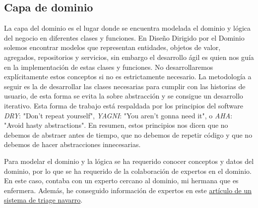 \subsection{Capa de dominio}
La capa del dominio es el lugar donde se encuentra modelada el dominio y lógica del negocio en diferentes clases y funciones.
En Diseño Dirigido por el Dominio solemos encontrar modelos que representan entidades, objetos de valor, agregados, repositorios y servicios, sin embargo
el desarrollo ágil es quien nos guía en la implementación de estas clases y funciones. No desarrollaremos explícitamente estos conceptos si no es estrictamente necesario.
La metodología a seguir es la de desarrollar las clases necesarias para cumplir con las historias de usuario, de esta forma se evita la sobre abstracción y se consigue un desarrollo iterativo.
Esta forma de trabajo está respaldada por los principios del software \textit{DRY}: "Don't repeat yourself", \textit{YAGNI}: "You aren't gonna need it", o \textit{AHA}: "Avoid hasty abstractions".
En resumen, estos principios nos dicen que no debemos de abstraer antes de tiempo, que no debemos de repetir código y que no debemos de hacer abstracciones innecesarias.

Para modelar el dominio y la lógica se ha requerido conocer conceptos y datos del dominio, por lo que se ha requerido de la colaboración de expertos en el dominio.
En este caso, contaba con un experto cercano al dominio, mi hermana que es enfermera. Además, he conseguido información de expertos en este \href{https://scielo.isciii.es/scielo.php?script=sci_arttext&pid=S1137-66272010000200008}{artículo de un sistema de triage navarro}.

